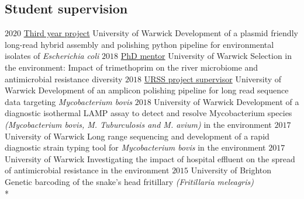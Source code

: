 \documentclass[hidelinks]{james-cv} %
\begin{document}
\subsection{Student supervision}
\hspace{-19\parskip}\begin{sentrylist}

\entr
{$2020$}
{\bodyfontsc\color{blue}\href{https://github.com/BadgerRob/Staging/blob/master/wrench.py}{Third year project}}
{University of Warwick}
{Development of a plasmid friendly long-read hybrid assembly and polishing python pipeline for environmental isolates of \textit{Escherichia coli}}
\entr
{$2018$}
{\bodyfontsc\color{blue}\href{https://www.biorxiv.org/content/10.1101/2020.06.05.133348v1}{PhD mentor}}
{University of Warwick}
{Selection in the environment: Impact of trimethoprim on the river microbiome and antimicrobial resistance diversity}
\entr
{$2018$}
{\bodyfontsc\color{blue}\href{https://www.biorxiv.org/content/10.1101/791129v2}{URSS project supervisor}}
{University of Warwick}
{Development of an amplicon polishing pipeline for long read sequence data targeting \textit {Mycobacterium bovis}}
\entr
{$2018$}
{}
{University of Warwick}
{Development of a diagnostic isothermal LAMP assay to detect and resolve Mycobacterium species\textit{ (Mycobacterium bovis, M. Tuburculosis and M. avium) } in the environment}
\entr
{$2017$}
{}
{University of Warwick}
{Long range sequencing and development of a rapid diagnostic strain typing tool for \textit{Mycobacterium bovis} in the environment}
\entr
{$2017$}
{}
{University of Warwick}
{Investigating the impact of hospital effluent on the spread of antimicrobial resistance in the environment}
\entr
{$2015$}
{}
{University of Brighton}
{Genetic barcoding of the snake's head fritillary \textit{(Fritillaria meleagris)}}\\*

\end{sentrylist}
\end{document}
